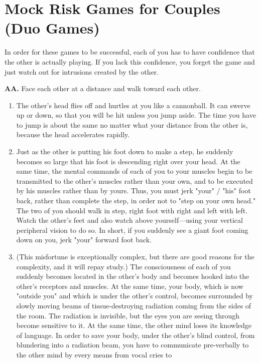 \section*{Mock Risk Games for Couples (Duo Games)}

In order for these games to 
be successful,  each of you has to have confidence that the other is actually
playing. If you lack this confidence, you forget the game and just watch out
for intrusions created by the other.

\textbf{AA.} Face each other at a distance and walk toward each other.
\begin{enumerate}
	\item The other's head flies off and hurtles at you like a cannonball. It can
		swerve up or down, so that you will be hit unless you jump aside. The time
		you have to jump is about the same no matter what your distance from the
		other is, because the head accelerates rapidly.
	\item Just as the other is putting his foot down to make a step, he suddenly
		becomes so large that his foot is descending right over your head. At the 
		same time, the mental commands of each of you to your muscles begin to be
		transmitted to the other's muscles rather than your own, and to be executed
		by his muscles rather than by yours. Thus, you must jerk "your" / "his" foot
		back, rather than complete the step, in order not to "step on your own
		head." The two of you should walk in step, right foot with right and left 
		with left. Watch the other's feet and also watch above yourself---using your
		vertical peripheral vision to do so. In short, if you suddenly see a giant foot
		coming down on you, jerk "your" forward foot back.
	\item (This misfortune is exceptionally complex, but there are good reasons for
		the complexity, and it will repay study.) The consciousness of each of you
		suddenly becomes located in the other's body and becomes hooked into the 
		other's receptors and muscles. At the same time, your body, which is now
		"outside you" and which is under the other's control, becomes surrounded
		by slowly moving beams of tissue-destroying radiation coming from the sides
		of the room. The radiation is invisible, but the eyes you are seeing through
		become sensitive to it. At the same time, the other mind loses its knowledge
		of language. In order to save your body, under the other's blind control,
		from blundering into a radiation beam, you have to communicate 
		pre-verbally to the other mind by every means from vocal cries to 

\end{enumerate}
